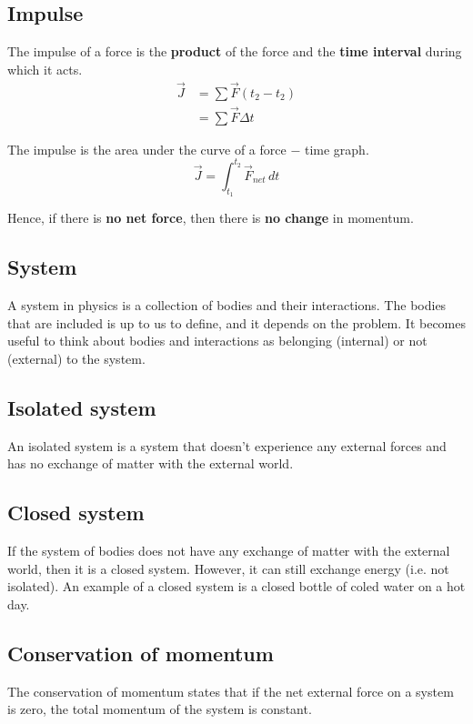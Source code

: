\documentclass[11pt]{article}
\begin{document}
\subsection{Impulse}
\label{sec:org4dbe514}
The impulse of a force is the \textbf{product} of the force and the \textbf{time interval} during which it acts.
\begin{align*}
\vec{J} &= \sum \vec{F} (t_2 - t_2) \\
&= \sum \vec{F} \Delta t
\end{align*}

The impulse is the area under the curve of a force \(-\) time graph.
\[\vec{J} = \int_{t_1}^{t_2} \vec{F}_{net} \, dt\]

Hence, if there is \textbf{no net force}, then there is \textbf{no change} in momentum.

\subsection{System}
\label{sec:org5b879b1}
A system in physics is a collection of bodies and their interactions. The bodies that are included is up to us to define, and it depends on the problem. It becomes useful to think about bodies and interactions as belonging (internal) or not (external) to the system.

\subsection{Isolated system}
\label{sec:org1f35242}
An isolated system is a system that doesn't experience any external forces and has no exchange of matter with the external world.

\subsection{Closed system}
\label{sec:org6550f1a}
If the system of bodies does not have any exchange of matter with the external world, then it is a closed system. However, it can still exchange energy (i.e. not isolated). An example of a closed system is a closed bottle of coled water on a hot day.

\subsection{Conservation of momentum}
\label{sec:org168c655}
The conservation of momentum states that if the net external force on a system is zero, the total momentum of the system is constant.
\\[0pt]
\end{document}
